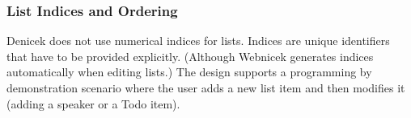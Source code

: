 \documentclass[sigconf,anonymous,screen]{acmart}
\newcommand{\ident}[1]{{\sffamily #1}}
\begin{document}
%
%


%


\subsubsection*{List Indices and Ordering}
Denicek does not use numerical indices for lists. Indices are unique identifiers that have to
be provided explicitly. (Although Webnicek generates indices automatically when editing lists.)
The design supports a programming by demonstration scenario where the user adds a new list item
and then modifies it (adding a speaker or a Todo item).
\end{document}
